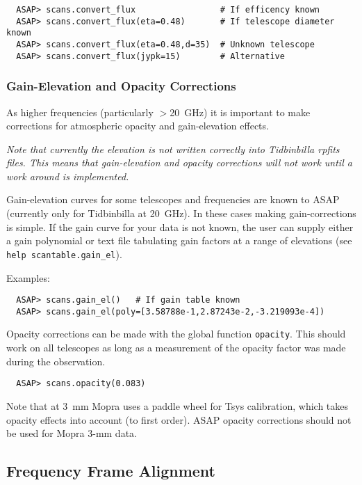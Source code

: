 \documentclass[11pt]{article}
\newcommand{\cmd}[1]{{\tt #1}}
\begin{document}
\begin{verbatim}
  ASAP> scans.convert_flux                 # If efficency known
  ASAP> scans.convert_flux(eta=0.48)       # If telescope diameter known
  ASAP> scans.convert_flux(eta=0.48,d=35)  # Unknown telescope
  ASAP> scans.convert_flux(jypk=15)        # Alternative
\end{verbatim}

\subsubsection{Gain-Elevation and Opacity Corrections}

As higher frequencies (particularly $>$20~GHz) it is important to make
corrections for atmospheric opacity and gain-elevation effects.

{\em Note that currently the elevation is not written correctly into
Tidbinbilla rpfits files. This means that gain-elevation and opacity
corrections will not work until a work around is implemented.}

Gain-elevation curves for some telescopes and frequencies are known to
ASAP (currently only for Tidbinbilla at 20~GHz).  In these cases making
gain-corrections is simple.  If the gain curve for your data is not
known, the user can supply either a gain polynomial or text file
tabulating gain factors at a range of elevations (see \cmd{help
scantable.gain\_el}).

Examples:

\begin{verbatim}
  ASAP> scans.gain_el()   # If gain table known
  ASAP> scans.gain_el(poly=[3.58788e-1,2.87243e-2,-3.219093e-4])
\end{verbatim}

Opacity corrections can be made with the global function
\cmd{opacity}. This should work on all telescopes as long as a
measurement of the opacity factor was made during the observation.

\begin{verbatim}
  ASAP> scans.opacity(0.083)
\end{verbatim}

Note that at 3~mm Mopra uses a paddle wheel for Tsys calibration,
which takes opacity effects into account (to first order). ASAP
opacity corrections should not be used for Mopra 3-mm data.

\subsection{Frequency Frame Alignment}
\end{document}
